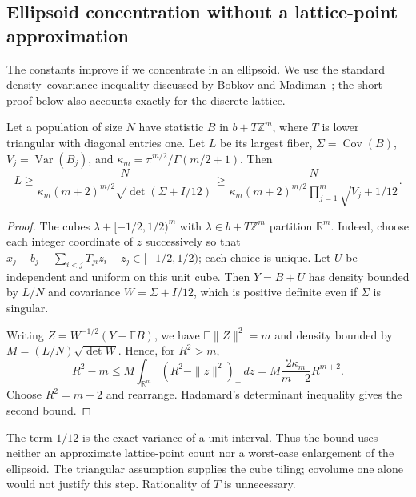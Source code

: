 \subsection{Ellipsoid concentration without a lattice-point approximation}
\label{sec:ellipsoid-concentration}

The constants improve if we concentrate in an ellipsoid. We use the
standard density--covariance inequality discussed by
Bobkov and Madiman~\cite{bobkovmadiman}; the short proof below also
accounts exactly for the discrete lattice.

\begin{proposition}
\label{prop:ellipsoid-concentration}
Let a population of size $N$ have statistic $B$ in
$b+T\mathbb Z^m$, where $T$ is lower triangular with diagonal entries
one. Let $L$ be its largest fiber, $\Sigma=\operatorname{Cov}(B)$,
$V_j=\operatorname{Var}(B_j)$, and
$\kappa_m=\pi^{m/2}/\Gamma(m/2+1)$. Then
\[
 L\ge\frac{N}{\kappa_m(m+2)^{m/2}
                  \sqrt{\det(\Sigma+I/12)}}
 \ge\frac{N}{\kappa_m(m+2)^{m/2}
                  \prod_{j=1}^m\sqrt{V_j+1/12}}.
\]
\end{proposition}
\begin{proof}
The cubes $\lambda+[-1/2,1/2)^m$ with
$\lambda\in b+T\mathbb Z^m$ partition $\mathbb R^m$.
Indeed, choose each integer coordinate of $z$ successively so that
$x_j-b_j-\sum_{i<j}T_{ji}z_i-z_j\in[-1/2,1/2)$; each choice
is unique. Let $U$ be independent and uniform on this unit cube.
Then $Y=B+U$ has density bounded by $L/N$ and covariance
$W=\Sigma+I/12$, which is positive definite even if $\Sigma$ is singular.

Writing $Z=W^{-1/2}(Y-\mathbb EB)$, we have
$\mathbb E\|Z\|^2=m$ and density bounded by
$M=(L/N)\sqrt{\det W}$. Hence, for $R^2>m$,
\[
 R^2-m
 \le M\int_{\mathbb R^m}(R^2-\|z\|^2)_+\,dz
 =M\frac{2\kappa_m}{m+2}R^{m+2}.
\]
Choose $R^2=m+2$ and rearrange. Hadamard's determinant inequality
gives the second bound.
\end{proof}

The term $1/12$ is the exact variance of a unit interval. Thus the
bound uses neither an approximate lattice-point count nor a worst-case
enlargement of the ellipsoid. The triangular assumption supplies the
cube tiling; covolume one alone would not justify this step. Rationality
of $T$ is unnecessary.

